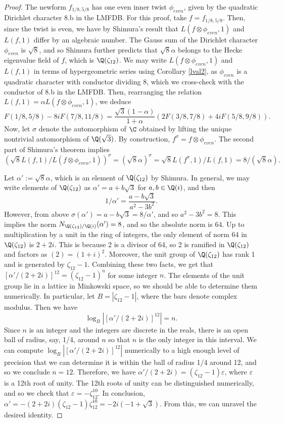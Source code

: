 \documentclass[12pt]{amsart}
\theoremstyle{definition}
\theoremstyle{remark}
\renewcommand{\epsilon}{\varepsilon}
\begin{document}
\begin{proof}
The newform $f_{1/8,5/8}$ has one even inner twist $\phi_{even}$, given by the quadratic Dirichlet character 8.b in the LMFDB. For this proof, take $f=f_{1/8,5/8}$. Then, since the twist is even, we have by Shimura's result that $L(f\otimes \phi_{even},1)$ and $L(f,1)$ differ by an algebraic number. The Gauss sum of the Dirichlet character $\phi_{even}$ is $\sqrt{8}$, and so Shimura further predicts that $\sqrt{8}\alpha$ belongs to the Hecke eigenvalue field of $f$, which is $\Q(\zeta_{12})$. We may write $L(f\otimes \phi_{even},1)$ and $L(f,1)$ in terms of hypergeometric series using Corollary \ref{lval2}, as $\phi_{even}$ is a quadratic character with conductor dividing 8, which we cross-check with the conductor of 8.b in the LMFDB. Then, rearranging the relation $L(f,1)=\alpha L(f\otimes \phi_{even},1)$, we deduce $$ F(1/8,5/8)-8iF(7/8,11/8)=\frac{\sqrt{3}(1-\alpha)}{1+\alpha}(2F(3/8,7/8)+4iF(5/8,9/8)).$$ Now, let $\sigma$ denote the automorphism of $\C$ obtained by lifting the unique nontrivial automorphism of $\Q(\sqrt{3})$. By construction, $f^\sigma=f\otimes \phi_{even}$. The second part of Shimura's theorem implies $$(\sqrt{8}L(f,1)/L(f\otimes \phi_{even},1))^\sigma=(\sqrt{8}\alpha)^\sigma=\sqrt{8} L(f^\sigma,1)/L(f,1)=8/(\sqrt{8}\alpha).$$ 

Let $\alpha':=\sqrt{8}\alpha$,  which is an element of $\Q(\zeta_{12})$ by Shimura. In general, we may write elements of $\Q(\zeta_{12})$ as $\alpha'=a+b\sqrt{3}$ for $a,b\in \Q(i)$, and then $$1/\alpha'=\frac{a-b\sqrt{3}}{a^2-3b^2}.$$ However, from above $\sigma(\alpha')=a-b\sqrt{3}=8/\alpha'$, and so $a^2-3b^2=8$. This implies the norm $N_{\Q(\zeta_{12})/\Q(i)}(\alpha')=8$, and so the absolute norm is 64. Up to multiplication by a unit in the ring of integers, the only element of norm 64 in $\Q(\zeta_{12})$ is $2+2 i$. This is because 2 is a divisor of 64, so 2 is ramified in $\Q(\zeta_{12})$ and factors as $(2)=(1+i)^2$. Moreover, the unit group of $\Q(\zeta_{12})$ has rank 1 and is generated by $\zeta_{12}-1$. Combining these two facts, we get that $[\alpha'/(2+2i)]^{12}=(\zeta_{12}-1)^n$ for some integer $n$. The elements of the unit group lie in a lattice in Minkowski space, so we should be able to determine them numerically. In particular, let $B=|\zeta_{12}-1|$, where the bars denote complex modulus. Then we have $$\log_B|[\alpha'/(2+2i)]^{12}|=n.$$ Since $n$ is an integer and the integers are discrete in the reals, there is an open ball of radius, say, 1/4, around $n$ so that $n$ is the only integer in this interval. We can compute $\log_B|[\alpha'/(2+2i)]^{12}|$ numerically to a high enough level of precision that we can determine it is within the ball of radius 1/4 around 12, and so we conclude $n=12$. Therefore, we have $\alpha'/(2+2i)=(\zeta_{12}-1)\epsilon$, where $\epsilon$ is a 12th root of unity. The 12th roots of unity can be distinguished numerically, and so we check that $\epsilon=-\zeta_{12}^{10}$. In conclusion, $\alpha'=-(2+2i)(\zeta_{12}-1)\zeta_{12}^{10}=-2 i (-1 + \sqrt{3})$. From this, we can unravel the desired identity.
\end{proof}
\end{document}

